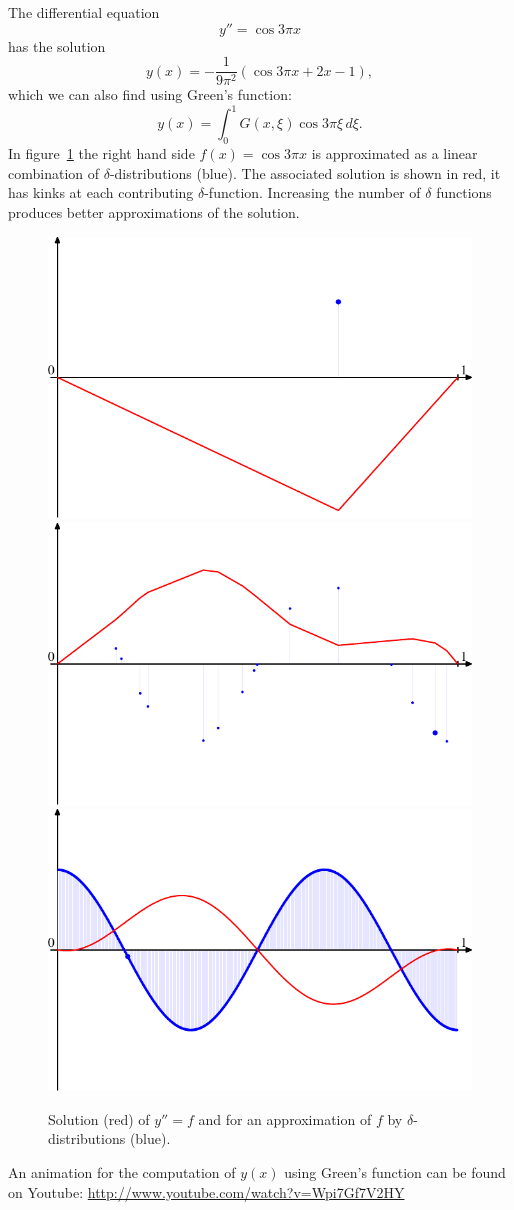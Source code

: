 \begin{beispiel}
The differential equation
\[
y''=\cos 3\pi x
\]
has the solution
\[
y(x)=-\frac1{9\pi^2}(\cos 3\pi x + 2x - 1),
\]
which we can also find using Green's function:
\[
y(x)=\int_0^1 G(x,\xi)\cos 3\pi\xi\,d\xi.
\]
In figure~\ref{elliptisch:green-beispiele}
the right hand side $f(x)=\cos 3\pi x$ is approximated as a linear
combination of $\delta$-distributions (blue).
The associated solution is shown in red, it has kinks at each 
contributing $\delta$-function.
Increasing the number of $\delta$ functions produces better approximations
of the solution.
\begin{figure}
\begin{center}
\includegraphics[width=0.7\hsize]{../common/graphics/green-1.pdf}\\
\includegraphics[width=0.7\hsize]{../common/graphics/green-324.pdf}\\
\includegraphics[width=0.7\hsize]{../common/graphics/green-1082.pdf}
\end{center}
\caption{Solution (red) of $y''=f$ and for an approximation of $f$ by
$\delta$-distributions (blue).
\label{elliptisch:green-beispiele}}
\end{figure}

An animation for the computation of $y(x)$ using Green's function
can be found on Youtube:
\url{http://www.youtube.com/watch?v=Wpi7Gf7V2HY}
\end{beispiel}

